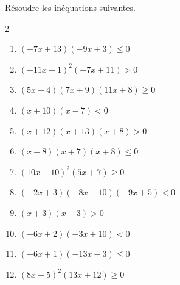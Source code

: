 {%
\begin{Exercice}%
Résoudre les inéquations suivantes.
\vspace{-0.5cm}
\begin{multicols}{2}
\begin{enumerate}[itemsep=2em]
	\item \begin{minipage}[t]{\linewidth}$(-7x+13)(-9x+3)\leqslant0$\end{minipage}
	\item \begin{minipage}[t]{\linewidth}$(-11x+1)^2(-7x+11)>0$\end{minipage}
	\item \begin{minipage}[t]{\linewidth}$(5x+4)(7x+9)(11x+8)\geqslant0$\end{minipage}
	\item \begin{minipage}[t]{\linewidth}$(x+10)(x-7)<0$\end{minipage}
	\item \begin{minipage}[t]{\linewidth}$(x+12)(x+13)(x+8)>0$\end{minipage}
	\item \begin{minipage}[t]{\linewidth}$(x-8)(x+7)(x+8)\leqslant0$\end{minipage}
	\item \begin{minipage}[t]{\linewidth}$(10x-10)^2(5x+7)\geqslant0$\end{minipage}
	\item \begin{minipage}[t]{\linewidth}$(-2x+3)(-8x-10)(-9x+5)<0$\end{minipage}
	\item \begin{minipage}[t]{\linewidth}$(x+3)(x-3)>0$\end{minipage}
	\item \begin{minipage}[t]{\linewidth}$(-6x+2)(-3x+10)<0$\end{minipage}
	\item \begin{minipage}[t]{\linewidth}$(-6x+1)(-13x-3)\leqslant0$\end{minipage}
	\item \begin{minipage}[t]{\linewidth}$(8x+5)^2(13x+12)\geqslant0$\end{minipage}
\end{enumerate}
\end{multicols}
\end{Exercice}


}
